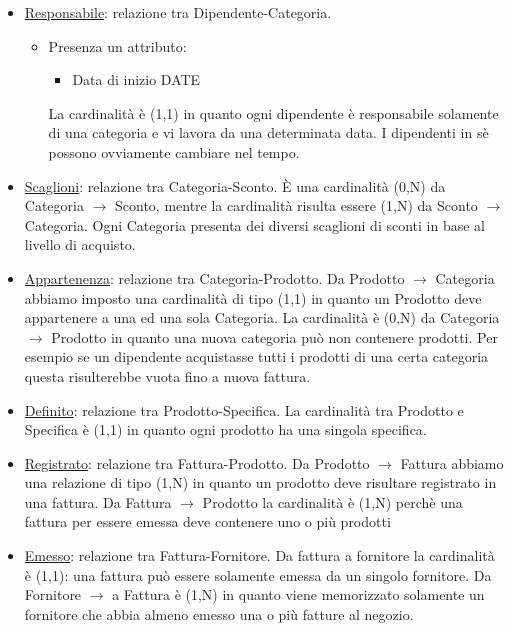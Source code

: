 \begin{itemize}

\item \underline{Responsabile}: relazione tra Dipendente-Categoria.
  \begin{itemize}
  \item Presenza un attributo:
  \begin{itemize}
  \item Data di inizio DATE
  \end{itemize}
  La cardinalit\`a \`e (1,1) in quanto ogni dipendente \`e responsabile solamente di una categoria e vi lavora da una determinata data. I dipendenti in s\`e possono ovviamente cambiare nel tempo.

  \end{itemize}

\item \underline{Scaglioni}: relazione tra Categoria-Sconto. \`E una cardinalit\`a (0,N) da Categoria $\to$ Sconto, mentre la cardinalit\`a risulta essere (1,N) da Sconto $\to$ Categoria. \newline
Ogni Categoria presenta dei diversi scaglioni di sconti in base al livello di acquisto.

\item \underline{Appartenenza}: relazione tra Categoria-Prodotto. Da Prodotto $\to$ Categoria abbiamo imposto una cardinalit\`a di tipo (1,1) in quanto un Prodotto deve appartenere a una ed una sola Categoria. \newline
  La cardinalit\`a \`e (0,N) da Categoria $\to$ Prodotto in quanto una nuova categoria pu\`o non contenere prodotti.\newline
  Per esempio se un dipendente acquistasse tutti  i prodotti di una certa categoria questa risulterebbe vuota fino a nuova fattura.

\item \underline{Definito}: relazione tra Prodotto-Specifica. La cardinalit\`a tra Prodotto e Specifica \`e (1,1) in quanto ogni prodotto ha una singola specifica.

\item \underline{Registrato}: relazione tra Fattura-Prodotto. Da Prodotto $\to$ Fattura abbiamo una relazione di tipo (1,N) in quanto un prodotto deve risultare registrato in una fattura. \newline
  Da Fattura $\to$ Prodotto la cardinalit\`a \`e (1,N) perch\`e una fattura per essere emessa deve contenere uno o pi\`u prodotti

\item \underline{Emesso}: relazione tra Fattura-Fornitore. Da fattura a fornitore la cardinalit\`a \`e (1,1): una fattura pu\`o essere solamente emessa da un singolo fornitore. \newline
  Da Fornitore $\to$ a Fattura \`e (1,N) in quanto viene memorizzato solamente un fornitore che abbia almeno emesso una o pi\`u fatture al negozio.


\end{itemize}
